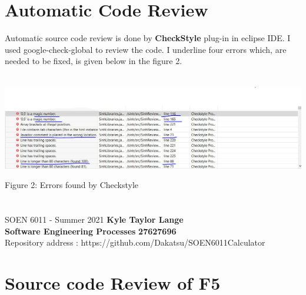 \documentclass[letterpaper, 11pt]{report}
\begin{document}
\section*{Automatic Code Review}
Automatic source code review is done by  \textbf{CheckStyle}\cite{CheckStyle} plug-in in eclipse IDE. I used google-check-global to review the code. I underline four errors which, are needed to be fixed, is given below in the figure 2.  \\\\
\begin{center}
\includegraphics[width= 14cm]{F3_Code_Review_Checkstyle}
\end{center}
\begin{center}
Figure 2: Errors found by Checkstyle \end{center}
\pagebreak

\section*{}
\normalsize {SOEN 6011 - Summer 2021} \hfill \textbf{Kyle Taylor Lange} \\
\textbf{ Software Engineering Processes}  \hfill \textbf{27627696} \\
\hfill Repository address : https://github.com/Dakatsu/SOEN6011Calculator
\\
\section*{Source code Review of F5}
\end{document}
